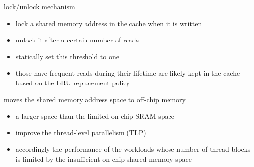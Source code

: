 \documentclass[
    fontset=fandol,
    xcolor=svgnames %
]{ctexbeamer}
\begin{document}
\begin{frame}

    \begin{block}{lock/unlock mechanism}
        \begin{itemize}
            \item lock a shared memory address in the cache when it is written
            \item unlock it after a certain number of reads
            \item statically set this threshold to one
            \item those have frequent reads during their lifetime are likely kept in the cache based on the LRU replacement policy
        \end{itemize}
    \end{block}

\end{frame}

\begin{frame}

    \begin{block}{moves the shared memory address space to off-chip memory}
        \begin{itemize}
            \item a larger space than the limited on-chip SRAM space
            \item improve the thread-level parallelism (TLP)
            \item accordingly the performance of the workloads whose number of thread blocks is limited by the insufficient on-chip shared memory space
        \end{itemize}
    \end{block}

\end{frame}
\end{document}
